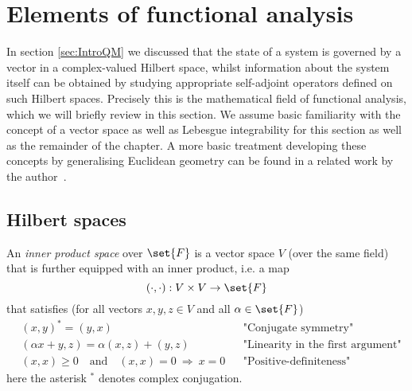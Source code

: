 \section{Elements of functional analysis}

In section \vref{sec:IntroQM} we discussed that the state
of a \QM system is governed by a vector in a complex-valued Hilbert space,
whilst information about the system itself can be obtained by studying
appropriate self-adjoint operators defined on such Hilbert spaces.
Precisely this is the mathematical field of functional analysis,
which we will briefly review in this section.
We assume basic familiarity with the concept of a vector space as well
as Lebesgue integrability for this section as well as the remainder of the chapter.
A more basic treatment developing these concepts by generalising
Euclidean geometry can be found in a related work by the author~\cite{DiracNotation}.


\subsection{Hilbert spaces}
\label{sec:Hilbert}


\begin{defn}
	An \emph{inner product space} over $\set{F}$ is a vector space $V$ (over the same field) that is further equipped with an inner product, i.e. a map
	\[ (\cdot,\cdot) : V \times V \to \set{F} \]
	that satisfies (for all vectors $x,y,z \in V$ and all $\alpha \in \set{F}$)
	\begin{align}
		\label{eqn:innProdConjSym}  &(x,y)^\ast = (y,x) &&                                                 \text{"Conjugate symmetry"} \\
		\label{eqn:innProdLinLeft}  &(\alpha x + y,z) = \alpha (x,z) + (y,z) &&                            \text{"Linearity in the first argument"} \\
		\label{eqn:innProdPosDef}   &(x,x) \ge 0 \quad \text{and} \quad (x,x) = 0 ~\Rightarrow~ x = 0  &&  \text{"Positive-definiteness"}
	\end{align}
	here the asterisk $^\ast$ denotes complex conjugation.
\end{defn}

